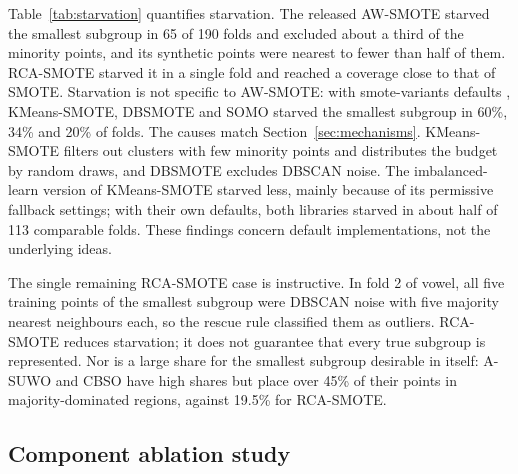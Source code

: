 \documentclass[preprint,nopreprintline]{elsarticle}
\theoremstyle{plain}
\theoremstyle{definition}
\begin{document}
Table~\ref{tab:starvation} quantifies starvation. The released AW-SMOTE starved the smallest subgroup in 65 of 190 folds and excluded about a third of the minority points, and its synthetic points were nearest to fewer than half of them. RCA-SMOTE starved it in a single fold and reached a coverage close to that of SMOTE. Starvation is not specific to AW-SMOTE: with smote-variants defaults \cite{kovacs2019smotevariants}, KMeans-SMOTE, DBSMOTE and SOMO starved the smallest subgroup in 60\%, 34\% and 20\% of folds. The causes match Section~\ref{sec:mechanisms}. KMeans-SMOTE filters out clusters with few minority points and distributes the budget by random draws, and DBSMOTE excludes DBSCAN noise. The imbalanced-learn version of KMeans-SMOTE starved less, mainly because of its permissive fallback settings; with their own defaults, both libraries starved in about half of 113 comparable folds. These findings concern default implementations, not the underlying ideas.

The single remaining RCA-SMOTE case is instructive. In fold 2 of vowel, all five training points of the smallest subgroup were DBSCAN noise with five majority nearest neighbours each, so the rescue rule classified them as outliers. RCA-SMOTE reduces starvation; it does not guarantee that every true subgroup is represented. Nor is a large share for the smallest subgroup desirable in itself: A-SUWO and CBSO have high shares but place over 45\% of their points in majority-dominated regions, against 19.5\% for RCA-SMOTE.

\subsection{Component ablation study}\label{sec:ablation}
\end{document}
